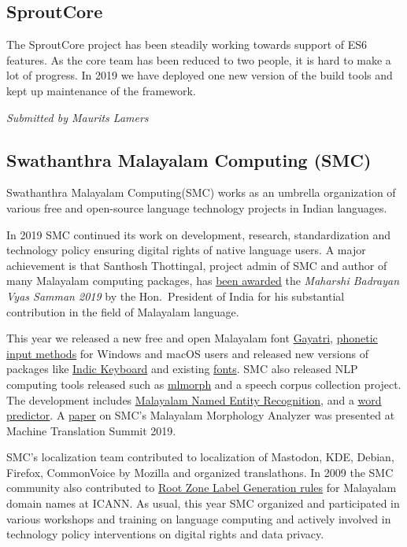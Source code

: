 \documentclass[a4paper]{report}
\begin{document}
\subsection{SproutCore}

The SproutCore project has been steadily working towards support of ES6
features.  As the core team has been reduced to two people, it is hard
to make a lot of progress.  In 2019 we have deployed one new version of
the build tools and kept up maintenance of the framework.

{\em Submitted by Maurits Lamers}

\subsection{Swathanthra Malayalam Computing (SMC)}

Swathanthra Malayalam Computing(SMC) works as an umbrella organization
of various free and open-source language technology projects in Indian
languages.

In 2019 SMC continued its work on development, research, standardization
and technology policy ensuring digital rights of native language users.
A major achievement is that Santhosh Thottingal, project admin of SMC
and author of many Malayalam computing packages, has
\href{https://blog.smc.org.in/santhosh-thottingal-wins-the-presidents-maharshi-badrayan-vyas-samman-for-2019}{been
awarded} the {\em Maharshi Badrayan Vyas Samman 2019} by the Hon.\
President of India for his substantial contribution in the field of
Malayalam language.

This year we released a new free and open Malayalam font
\href{https://gitlab.com/smc/fonts/gayathri}{Gayatri},
\href{https://swanalekha.smc.org.in/}{phonetic input methods} for
Windows and macOS users and released new versions of packages like
\href{https://indic.app/}{Indic Keyboard} and existing
\href{https://smc.org.in/fonts/}{fonts}.  SMC also released NLP
computing tools released such as
\href{https://pypi.org/project/mlmorph/}{mlmorph} and a speech corpus
collection project. The development includes
\href{https://morph.smc.org.in/ner}{Malayalam Named Entity Recognition},
and a \href{https://blog.smc.org.in/markov-chain-for-malayalam/}{word
predictor}.  A \href{https://aclweb.org/anthology/W19-6801}{paper} on
SMC's Malayalam Morphology Analyzer was presented at Machine Translation
Summit 2019.

SMC's localization team contributed to localization of Mastodon, KDE,
Debian, Firefox, CommonVoice by Mozilla and organized translathons.  In
2009 the SMC community also contributed to
\href{https://blog.smc.org.in/root-zone-label-generation-rules-for-malayalam/}{Root
Zone Label Generation rules} for Malayalam domain names at ICANN. As
usual, this year SMC organized and participated in various workshops and
training on language computing and actively involved in technology
policy interventions on digital rights and data privacy.
\end{document}
